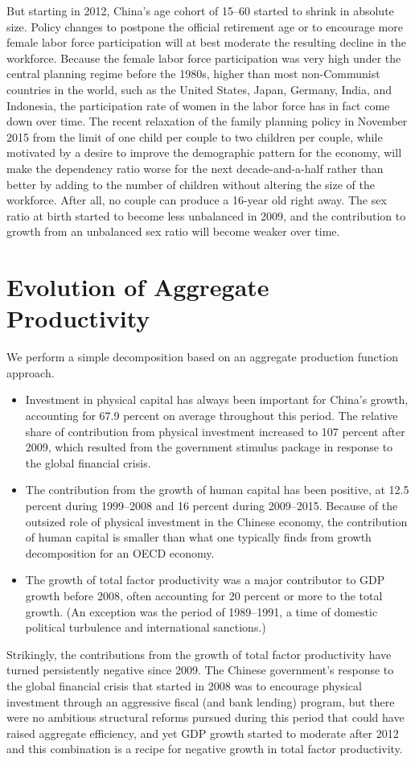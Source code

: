 \documentclass{article}
\begin{document}
    But starting in 2012, China’s age cohort of 15–60 started to shrink in absolute size. Policy changes to postpone the official retirement age or to encourage more female labor force participation will at best moderate the resulting decline in the workforce. Because the female labor force participation was very high under the central planning regime before the 1980s, higher than most non-Communist countries in the world, such as the United States, Japan, Germany, India, and Indonesia, the participation rate of women in the labor force has in fact come down over time. The recent relaxation of the family planning policy in November 2015 from the limit of one child per couple to two children per couple, while motivated by a desire to improve the demographic pattern for the economy, will make the dependency ratio worse for the next decade-and-a-half rather than better by adding to the number of children without altering the size of the workforce. After all, no couple can produce a 16-year old right away. The sex ratio at birth started to become less unbalanced in 2009, and the contribution to growth from an unbalanced sex ratio will become weaker over time.
    \section*{Evolution of Aggregate Productivity}
    We perform a simple decomposition based on an aggregate production function approach.
    \begin{itemize}
        \item Investment in physical capital has always been important for China’s growth, accounting for 67.9 percent on average throughout this period. The relative share of contribution from physical investment increased to 107 percent after 2009, which resulted from the government stimulus package in response to the global financial crisis.
        \item The contribution from the growth of human capital has been positive, at 12.5 percent during 1999–2008 and 16 percent during 2009–2015. Because of the outsized role of physical investment in the Chinese economy, the contribution of human capital is smaller than what one typically finds from growth
        decomposition for an OECD economy.
        \item The growth of total factor productivity was a major contributor to GDP growth before 2008, often accounting for 20 percent or more to the total growth. (An exception was the period of 1989–1991, a time of domestic political turbulence and international sanctions.)
    \end{itemize}
    Strikingly, the contributions from the growth of total factor productivity have turned persistently negative since 2009. The Chinese government’s response to the global financial crisis that started in 2008 was to encourage physical investment through an aggressive fiscal (and bank lending) program, but there were no ambitious structural reforms pursued during this period that could have raised aggregate efficiency, and yet GDP growth started to moderate after 2012 and this combination is a recipe for negative growth in total factor productivity.
\end{document}
